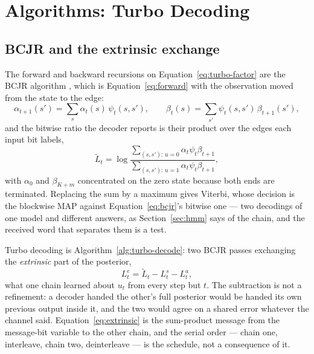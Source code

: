 \documentclass[11pt,a4paper]{article}
\begin{document}
\section{Algorithms: Turbo Decoding}
\label{sec:turbo:algorithms}

\subsection{BCJR and the extrinsic exchange}
The forward and backward recursions on Equation~\ref{eq:turbo-factor} are
the BCJR algorithm \citep{bahl1974}, which is
Equation~\ref{eq:forward} with the observation moved from the state to the
edge:
\begin{equation}
  \alpha_{t+1}(s') = \sum_{s} \alpha_t(s)\,\psi_t(s, s'),
  \qquad
  \beta_{t}(s) = \sum_{s'} \psi_t(s, s')\,\beta_{t+1}(s'),
  \label{eq:bcjr-recursions}
\end{equation}
and the bitwise ratio the decoder reports is their product over the edges
each input bit labels,
\begin{equation}
  \tilde L_t = \log
    \frac{\sum_{(s,s'):\,u=0} \alpha_t \psi_t \beta_{t+1}}
         {\sum_{(s,s'):\,u=1} \alpha_t \psi_t \beta_{t+1}},
  \label{eq:bcjr}
\end{equation}
with $\alpha_0$ and $\beta_{K+m}$ concentrated on the zero state because
both ends are terminated. Replacing the sum by a maximum gives Viterbi,
whose decision is the blockwise MAP against Equation~\ref{eq:bcjr}'s
bitwise one --- two decodings of one model and different answers, as
Section~\ref{sec:hmm} says of the chain, and the received word that
separates them is a test.

Turbo decoding is Algorithm~\ref{alg:turbo-decode}: two BCJR passes
exchanging the \emph{extrinsic} part of the posterior,
\begin{equation}
  L^{e}_t = \tilde L_t - L^{s}_t - L^{a}_t,
  \label{eq:extrinsic}
\end{equation}
what one chain learned about $u_t$ from every step but $t$. The subtraction
is not a refinement: a decoder handed the other's full posterior would be
handed its own previous output inside it, and the two would agree on a
shared error whatever the channel said. Equation~\ref{eq:extrinsic} is the
sum-product message from the message-bit variable to the other chain, and
the serial order --- chain one, interleave, chain two, deinterleave --- is
the schedule, not a consequence of it.
\end{document}
